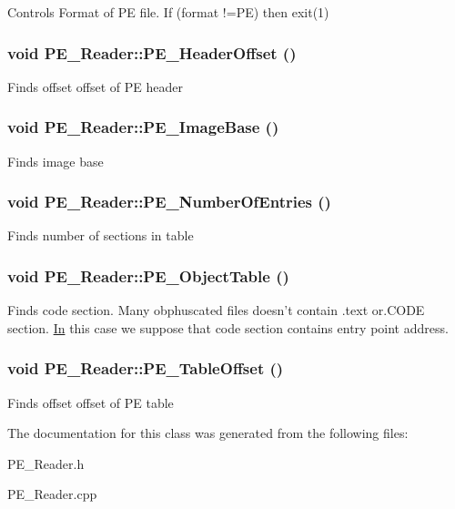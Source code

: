 \label{classPE__Reader_a492ea400cbf11105f029faab31d0f3fa}
Controls Format of PE file. If (format !=PE) then exit(1) \hypertarget{classPE__Reader_a6d3abab07f8d39fd1414cad8efb06418}{
\subsubsection[{PE\_\-HeaderOffset}]{\setlength{\rightskip}{0pt plus 5cm}void PE\_\-Reader::PE\_\-HeaderOffset ()}}
\label{classPE__Reader_a6d3abab07f8d39fd1414cad8efb06418}
Finds offset offset of PE header \hypertarget{classPE__Reader_a1f263c2df5da0e49bb5211617ae10335}{
\subsubsection[{PE\_\-ImageBase}]{\setlength{\rightskip}{0pt plus 5cm}void PE\_\-Reader::PE\_\-ImageBase ()}}
\label{classPE__Reader_a1f263c2df5da0e49bb5211617ae10335}
Finds image base \hypertarget{classPE__Reader_a6263cdcff862839e6fbbd296c0e060e8}{
\subsubsection[{PE\_\-NumberOfEntries}]{\setlength{\rightskip}{0pt plus 5cm}void PE\_\-Reader::PE\_\-NumberOfEntries ()}}
\label{classPE__Reader_a6263cdcff862839e6fbbd296c0e060e8}
Finds number of sections in table \hypertarget{classPE__Reader_a4896824d5df4cff3d693367fd8d8d454}{
\subsubsection[{PE\_\-ObjectTable}]{\setlength{\rightskip}{0pt plus 5cm}void PE\_\-Reader::PE\_\-ObjectTable ()}}
\label{classPE__Reader_a4896824d5df4cff3d693367fd8d8d454}
Finds code section. Many obphuscated files doesn't contain .text or.CODE section. \hyperlink{classIn}{In} this case we suppose that code section contains entry point address. \hypertarget{classPE__Reader_a32781a8fee1c88e2ec864ffd1657a192}{
\subsubsection[{PE\_\-TableOffset}]{\setlength{\rightskip}{0pt plus 5cm}void PE\_\-Reader::PE\_\-TableOffset ()}}
\label{classPE__Reader_a32781a8fee1c88e2ec864ffd1657a192}
Finds offset offset of PE table 

The documentation for this class was generated from the following files:\begin{DoxyCompactItemize}
\item 
PE\_\-Reader.h\item 
PE\_\-Reader.cpp\end{DoxyCompactItemize}
